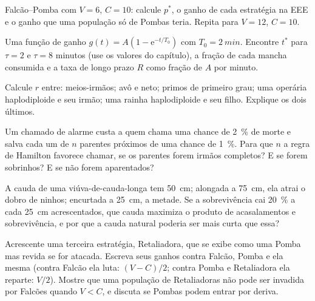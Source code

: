 \begin{exercise}[$\star\star$]\label{exo:b3:behavioural-ecology:5}
Falcão--Pomba com $V = 6$, $C = 10$: calcule $p^{*}$, o ganho de cada
estratégia na EEE e o ganho que uma população só de Pombas teria. Repita
para $V = 12$, $C = 10$.
\end{exercise}

\begin{exercise}[$\star\star$]\label{exo:b3:behavioural-ecology:6}
Uma função de ganho $g(t) = A(1 - \mathrm{e}^{-t/T_{0}})$ com $T_{0} =
\qty{2}{min}$. Encontre $t^{*}$ para $\tau = 2$ e $\tau = 8$ minutos (use
os valores do capítulo), a fração de cada mancha consumida e a taxa de
longo prazo $R$ como fração de $A$ por minuto.
\end{exercise}

\begin{exercise}[$\star\star$]\label{exo:b3:behavioural-ecology:7}
Calcule $r$ entre: meios-irmãos; avô e neto; primos de primeiro grau; uma
operária haplodiploide e seu irmão; uma rainha haplodiploide e seu filho.
Explique os dois últimos.
\end{exercise}

\begin{exercise}[$\star\star$]\label{exo:b3:behavioural-ecology:8}
Um chamado de alarme custa a quem chama uma chance de \qty{2}{\%} de
morte e salva cada um de $n$ parentes próximos de uma chance de
\qty{1}{\%}. Para que $n$ a regra de Hamilton favorece chamar, se os
parentes forem irmãos completos? E se forem sobrinhos? E se não forem
aparentados?
\end{exercise}

\begin{exercise}[$\star\star$]\label{exo:b3:behavioural-ecology:9}
A cauda de uma viúva-de-cauda-longa tem \qty{50}{cm}; alongada a
\qty{75}{cm}, ela atrai o dobro de ninhos; encurtada a \qty{25}{cm}, a
metade. Se a sobrevivência cai \qty{20}{\%} a cada \qty{25}{cm}
acrescentados, que cauda maximiza o produto de acasalamentos e
sobrevivência, e por que a cauda natural poderia ser mais curta que essa?
\end{exercise}

\begin{exercise}[$\star\star\star$]\label{exo:b3:behavioural-ecology:10}
Acrescente uma terceira estratégia, Retaliadora, que se exibe como uma
Pomba mas revida se for atacada. Escreva seus ganhos contra Falcão, Pomba
e ela mesma (contra Falcão ela luta: $(V - C)/2$; contra Pomba e
Retaliadora ela reparte: $V/2$). Mostre que uma população de
Retaliadoras não pode ser invadida por Falcões quando $V < C$, e discuta
se Pombas podem entrar por deriva.
\end{exercise}

